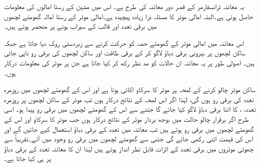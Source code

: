 یہ معائنہ ٹرانسفارمر کے قصر دور معائنہ کی طرح ہے۔ اس میں مشین کے رستا امالوں کی معلومات حاصل ہوتی ہے۔البتہ امالی موٹر کا مسئلہ ذرا زیادہ پیچیدہ ہے۔امالی موٹر کے رستا امالہ گھومتے لچھوں میں برقی تعدد اور قالب کے سیراب ہونے پر منحصر ہوتے ہیں۔

 اس معائنہ میں امالی موٹر کے گھومتے حصہ کو حرکت کرنے سے زبردستی روک دیا جاتا ہے جبکہ ساکن لچھوں پر بیرونی برقی دباؤ  لاگو کر کے برقی طاقت  اور ساکن لچھوں کی  برقی رو  ناپی جاتی ہیں۔ اصولی طور پر یہ معائنہ ان حالات کو مد نظر رکھ کر کیا جاتا ہے جن پر موٹر کی معلومات درکار ہوں۔

ساکن موٹر چالو کرنے کے  لمحہ پر موٹر کا سرکاو اکائی ہوتا ہے اور اس کے گھومتے لچھوں میں  روزمرہ تعدد   کی برقی رو  ہوں گی، لہٰذا اگر اس لمحہ کے نتائج درکار ہوں تب موٹر کے ساکن لچھوں پر روزمرہ تعدد، ،   کا اتنا برقی دباؤ لاگو کیا جائے گا جتنے سے اس کے گھومتے لچھوں میں برقی رو  پیدا ہو۔ اسی طرح اگر برقرار چالو حالت میں بوجھ بردار موٹر کے نتائج درکار ہوں جب موٹر کا سرکاو  اور اس کے گھومتے لچھوں میں برقی رو  ہوتے ہیں تب معائنہ میں  تعدد کے برقی دباؤ استعمال کیے جائیں گے اور اس کی قیمت  اتنی رکھی جائے گی جتنی سے گھومتے لچھوں میں  برقی رو وجود میں آئے۔تقریباً   سے چھوٹی موٹروں میں برقی تعدد کے اثرات قابل نظر انداز ہوتے ہیں لہٰذا ان کا معائنہ  تعدد کے برقی دباؤ پر ہی کیا جاتا ہے۔

